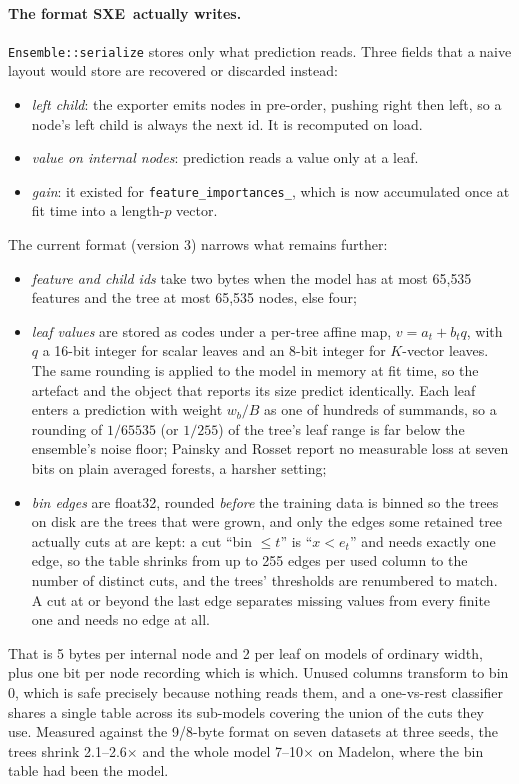 \documentclass[11pt,a4paper]{article}
\newcommand{\code}[1]{\texttt{\small #1}}
\newcommand{\SXE}{\textsc{SXE}}
\theoremstyle{definition}
\begin{document}
\paragraph{The format \SXE\ actually writes.} \code{Ensemble::serialize} stores
only what prediction reads. Three fields that a naive layout would store are
recovered or discarded instead:
\begin{itemize}[leftmargin=1.5em,itemsep=1pt]
\item \emph{left child}: the exporter emits nodes in pre-order, pushing right
then left, so a node's left child is always the next id. It is recomputed on
load.
\item \emph{value on internal nodes}: prediction reads a value only at a leaf.
\item \emph{gain}: it existed for \code{feature\_importances\_}, which is now
accumulated once at fit time into a length-$p$ vector.
\end{itemize}
The current format (version 3) narrows what remains further:
\begin{itemize}[leftmargin=1.5em,itemsep=1pt]
\item \emph{feature and child ids} take two bytes when the model has at most
65{,}535 features and the tree at most 65{,}535 nodes, else four;
\item \emph{leaf values} are stored as codes under a per-tree affine map,
$v = a_t + b_t q$, with $q$ a 16-bit integer for scalar leaves and an 8-bit
integer for $K$-vector leaves. The same rounding is applied to the model in
memory at fit time, so the artefact and the object that reports its size
predict identically. Each leaf enters a prediction with weight $w_b/B$ as one
of hundreds of summands, so a rounding of $1/65535$ (or $1/255$) of the tree's
leaf range is far below the ensemble's noise floor; Painsky and Rosset
\cite{painsky2019compression} report no measurable loss at seven bits on plain
averaged forests, a harsher setting;
\item \emph{bin edges} are float32, rounded \emph{before} the training data is
binned so the trees on disk are the trees that were grown, and only the edges
some retained tree actually cuts at are kept: a cut ``bin $\le t$'' is
``$x < e_t$'' and needs exactly one edge, so the table shrinks from up to 255
edges per used column to the number of distinct cuts, and the trees' thresholds
are renumbered to match. A cut at or beyond the last edge separates missing
values from every finite one and needs no edge at all.
\end{itemize}
That is 5 bytes per internal node and 2 per leaf on models of ordinary width,
plus one bit per node recording which is which. Unused columns transform to
bin 0, which is safe precisely because nothing reads them, and a one-vs-rest
classifier shares a single table across its sub-models covering the union of
the cuts they use. Measured against the 9/8-byte format on seven datasets at
three seeds, the trees shrink 2.1--2.6$\times$ and the whole model 7--10$\times$
on Madelon, where the bin table had been the model.
\end{document}
